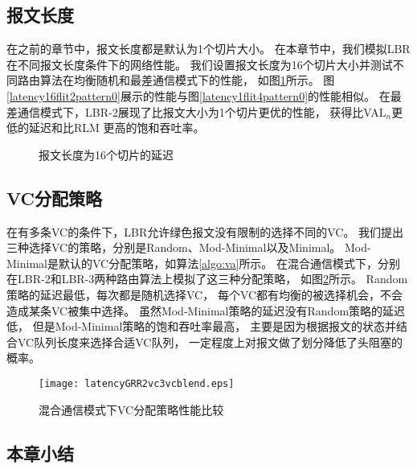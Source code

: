 \subsection{报文长度}

在之前的章节中，报文长度都是默认为1个切片大小。
在本章节中，我们模拟LBR在不同报文长度条件下的网络性能。
我们设置报文长度为16个切片大小并测试不同路由算法在均衡随机和最差通信模式下的性能，
如图\ref{fig:latency16flits}所示。
图\ref{latency16flit2pattern0}展示的性能与图\ref{latency1flit4pattern0}的性能相似。
在最差通信模式下，LBR-2展现了比报文大小为1个切片更优的性能，
获得比VAL$_n$更低的延迟和比RLM 更高的饱和吞吐率。

\begin{figure}[htbp]

  \centering
  \begin{minipage}[t]{\textwidth}
    \centering
    \caption{报文长度为16个切片的延迟}
    \label{fig:latency16flits}
  \end{minipage}
\end{figure}

\subsection{VC分配策略}

在有多条VC的条件下，LBR允许绿色报文没有限制的选择不同的VC。
我们提出三种选择VC的策略，分别是Random、Mod-Minimal以及Minimal。
Mod-Minimal是默认的VC分配策略，如算法\ref{algo:va}所示。
在混合通信模式下，分别在LBR-2和LBR-3两种路由算法上模拟了这三种分配策略，
如图\ref{fig:vcstrategies}所示。
Random策略的延迟最低，每次都是随机选择VC，
每个VC都有均衡的被选择机会，不会造成某条VC被集中选择。
虽然Mod-Minimal策略的延迟没有Random策略的延迟低，
但是Mod-Minimal策略的饱和吞吐率最高，
主要是因为根据报文的状态并结合VC队列长度来选择合适VC队列，
一定程度上对报文做了划分降低了头阻塞的概率。

\begin{figure}[t]
  \centering
  \texttt{[image: latencyGRR2vc3vcblend.eps]}
  \caption{混合通信模式下VC分配策略性能比较}
  \label{fig:vcstrategies}
\end{figure}

\subsection{本章小结}

